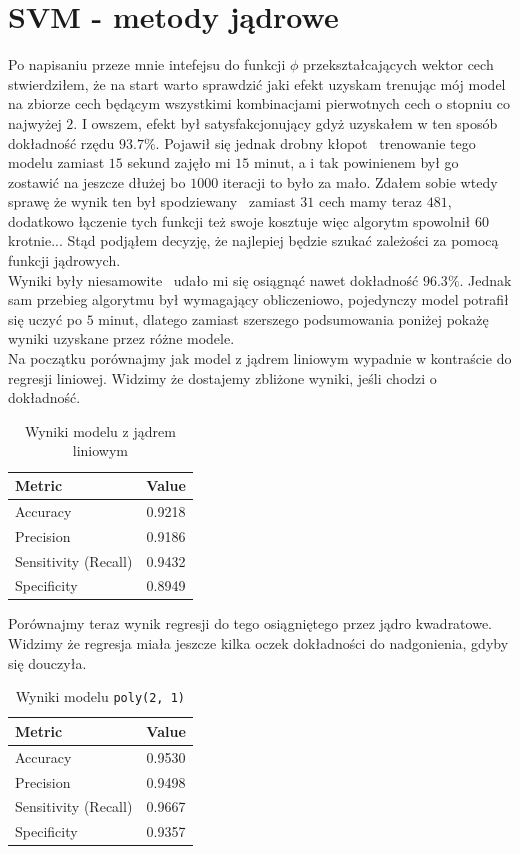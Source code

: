 \documentclass[polish,12pt,a4paper]{extarticle}
\begin{document}
\section*{SVM - metody jądrowe}
Po napisaniu przeze mnie intefejsu do funkcji $\phi$ przekształcających wektor cech stwierdziłem, że na start warto sprawdzić jaki efekt uzyskam trenując mój model na zbiorze cech będącym wszystkimi kombinacjami pierwotnych cech o stopniu co najwyżej $2$. I owszem, efekt był satysfakcjonujący gdyż uzyskałem w ten sposób dokładność rzędu $93.7\%$. Pojawił się jednak drobny kłopot \textendash\, trenowanie tego modelu zamiast $15$ sekund zajęło mi $15$ minut, a i tak powinienem był go zostawić na jeszcze dłużej bo $1000$ iteracji to było za mało. Zdałem sobie wtedy sprawę że wynik ten był spodziewany \textendash\, zamiast $31$ cech mamy teraz $481$, dodatkowo łączenie tych funkcji też swoje kosztuje więc algorytm spowolnił $60$ krotnie... Stąd podjąłem decyzję, że najlepiej będzie szukać zależości za pomocą funkcji jądrowych. \smallskip \\
Wyniki były niesamowite \textendash\, udało mi się osiągnąć nawet dokładność $96.3\%$. Jednak sam przebieg algorytmu był wymagający obliczeniowo, pojedynczy model potrafił się uczyć po $5$ minut, dlatego zamiast szerszego podsumowania poniżej pokażę wyniki uzyskane przez różne modele. \smallskip \\
Na początku porównajmy jak model z jądrem liniowym wypadnie w kontraście do regresji liniowej. Widzimy że dostajemy zbliżone wyniki, jeśli chodzi o dokładność.
\begin{table}[h!]
\centering
\begin{tabular}{|l|c|}
\hline
\textbf{Metric}     & \textbf{Value} \\
\hline
Accuracy   & 0.9218 \\
Precision  & 0.9186 \\
Sensitivity (Recall) & 0.9432 \\
Specificity & 0.8949 \\
\hline
\end{tabular}
\caption{Wyniki modelu z jądrem liniowym}
\label{tab:metrics}
\end{table}\FloatBarrier
Porównajmy teraz wynik regresji do tego osiągniętego przez jądro kwadratowe. Widzimy że regresja miała jeszcze kilka oczek dokładności do nadgonienia, gdyby się douczyła.
\begin{table}[h!]
\centering
\begin{tabular}{|l|c|}
\hline
\textbf{Metric}     & \textbf{Value} \\
\hline
Accuracy   & 0.9530 \\
Precision  & 0.9498 \\
Sensitivity (Recall) & 0.9667 \\
Specificity & 0.9357 \\
\hline
\end{tabular}
\caption{Wyniki modelu \texttt{poly(2, 1)}}
\label{tab:metrics}
\end{table} \FloatBarrier
\end{document}
